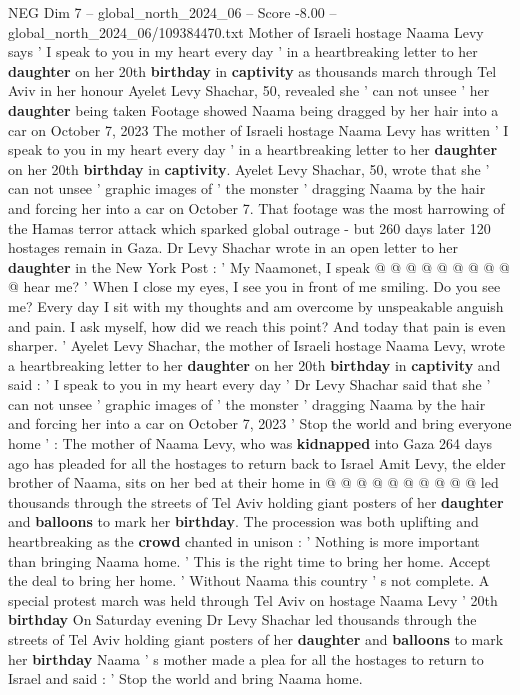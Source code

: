 \begin{textsample}{NEG Dim 7 – global\_north\_2024\_06 – Score -8.00 – global\_north\_2024\_06/109384470.txt}  \label{ex:f7_neg_133}
Mother of Israeli hostage Naama Levy says ' I speak to you in my heart every day ' in a heartbreaking letter to her \textbf{daughter} on her 20th \textbf{birthday} in \textbf{captivity} as thousands march through Tel Aviv in her honour Ayelet Levy Shachar, 50, revealed she ' can not unsee ' her \textbf{daughter} being taken Footage showed Naama being dragged by her hair into a car on October 7, 2023 The mother of Israeli hostage Naama Levy has written ' I speak to you in my heart every day ' in a heartbreaking letter to her \textbf{daughter} on her 20th \textbf{birthday} in \textbf{captivity}.
Ayelet Levy Shachar, 50, wrote that she ' can not unsee ' graphic images of ' the monster ' dragging Naama by the hair and forcing her into a car on October 7.
That footage was the most harrowing of the Hamas terror attack which sparked global outrage - but 260 days later 120 hostages remain in Gaza.
Dr Levy Shachar wrote in an open letter to her \textbf{daughter} in the New York Post : ' My Naamonet, I speak @ @ @ @ @ @ @ @ @ @ hear me? ' When I close my eyes, I see you in front of me smiling.
Do you see me?
Every day I sit with my thoughts and am overcome by unspeakable anguish and pain.
I ask myself, how did we reach this point?
And today that pain is even sharper. ' Ayelet Levy Shachar, the mother of Israeli hostage Naama Levy, wrote a heartbreaking letter to her \textbf{daughter} on her 20th \textbf{birthday} in \textbf{captivity} and said : ' I speak to you in my heart every day ' Dr Levy Shachar said that she ' can not unsee ' graphic images of ' the monster ' dragging Naama by the hair and forcing her into a car on October 7, 2023 ' Stop the world and bring everyone home ' : The mother of Naama Levy, who was \textbf{kidnapped} into Gaza 264 days ago has pleaded for all the hostages to return back to Israel Amit Levy, the elder brother of Naama, sits on her bed at their home in @ @ @ @ @ @ @ @ @ @ led thousands through the streets of Tel Aviv holding giant posters of her \textbf{daughter} and \textbf{balloons} to mark her \textbf{birthday}.
The procession was both uplifting and heartbreaking as the \textbf{crowd} chanted in unison : ' Nothing is more important than bringing Naama home. ' This is the right time to bring her home.
Accept the deal to bring her home. ' Without Naama this country ' s not complete.
A special protest march was held through Tel Aviv on hostage Naama Levy ' 20th \textbf{birthday} On Saturday evening Dr Levy Shachar led thousands through the streets of Tel Aviv holding giant posters of her \textbf{daughter} and \textbf{balloons} to mark her \textbf{birthday} Naama ' s mother made a plea for all the hostages to return to Israel and said : ' Stop the world and bring Naama home.

\end{textsample}
